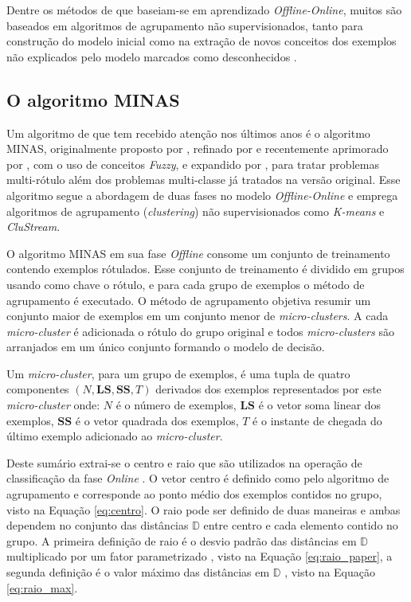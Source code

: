 Dentre os métodos de \nd que baseiam-se em aprendizado \emph{Offline-Online},
muitos são baseados em algoritmos de agrupamento não supervisionados, tanto
para construção do modelo inicial como na extração de novos conceitos dos
exemplos não explicados pelo modelo marcados como desconhecidos
\cite{Spinosa2009ollinda,Masud2010ECSMiner,Faria2013}.

\subsection{O algoritmo MINAS}\label{sec:minas-og}

Um algoritmo de \nd que tem recebido atenção nos últimos anos é o algoritmo
MINAS, originalmente proposto por , refinado por
 e recentemente aprimorado por
, com o uso de conceitos \emph{Fuzzy}, e expandido por
, para tratar problemas multi-rótulo além dos problemas
multi-classe já tratados na versão original.
Esse algoritmo segue a abordagem de duas fases no modelo \emph{Offline-Online} e
emprega algoritmos de agrupamento (\emph{clustering}) não supervisionados como
\emph{K-means} e \emph{CluStream}.

\newcommand{\mcluster}{\emph{micro-cluster}\xspace}
\newcommand{\mclusters}{\emph{micro-clusters}\xspace}

O algoritmo MINAS em sua fase \emph{Offline} consome um conjunto de treinamento
contendo exemplos rótulados.
Esse conjunto de treinamento é dividido em grupos usando como chave o rótulo,
e para cada grupo de exemplos o método de agrupamento é executado.
O método de agrupamento objetiva resumir um conjunto maior de exemplos em um
conjunto menor de \mclusters.
A cada \mcluster é adicionada o rótulo do grupo original e todos \mclusters
são arranjados em um único conjunto formando o modelo de decisão.

\begin{definition}
  Um \mcluster, para um grupo de exemplos, é uma tupla de quatro componentes
  $(N, \mathbf{LS}, \mathbf{SS}, T)$ derivados dos exemplos representados por
  este \mcluster onde:
  $N$ é o número de exemplos,
  $\mathbf{LS}$ é o vetor soma linear dos exemplos,
  $\mathbf{SS}$ é o vetor quadrada dos exemplos,
  $T$ é o instante de chegada do último exemplo adicionado ao \mcluster.
\end{definition}

Deste sumário extrai-se o centro e raio que são utilizados na operação de
classificação da fase \emph{Online} \cite{Faria2016minas}.
O vetor centro é definido como pelo algoritmo de agrupamento e corresponde ao
ponto médio dos exemplos contidos no grupo, visto na Equação \ref{eq:centro}.
O raio pode ser definido de duas maneiras e ambas dependem no conjunto das
distâncias $\mathbb{D}$ entre centro e cada elemento contido no grupo.
A primeira definição de raio é o desvio padrão das distâncias em $\mathbb{D}$
multiplicado por um fator parametrizado \cite{Faria2016minas}, visto na Equação
\ref{eq:raio_paper}, a segunda definição é o valor máximo das distâncias em
$\mathbb{D}$ \cite{Faria2013source}, visto na Equação \ref{eq:raio_max}.

